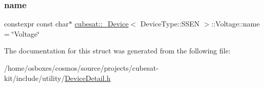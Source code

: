 \subsubsection{\texorpdfstring{name}{name}}
{\footnotesize\ttfamily constexpr const char$\ast$ \hyperlink{structcubesat_1_1__Device}{cubesat\+::\+\_\+\+Device}$<$ Device\+Type\+::\+S\+S\+EN $>$\+::Voltage\+::name = \char`\"{}Voltage\char`\"{}\hspace{0.3cm}{\ttfamily [static]}}



The documentation for this struct was generated from the following file\+:\begin{DoxyCompactItemize}
\item 
/home/osboxes/cosmos/source/projects/cubesat-\/kit/include/utility/\hyperlink{DeviceDetail_8h}{Device\+Detail.\+h}\end{DoxyCompactItemize}
